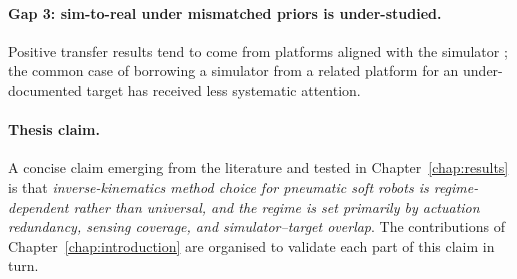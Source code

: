 \paragraph{Gap 3: sim-to-real under mismatched priors is under-studied.}
Positive transfer results tend to come from platforms aligned with the simulator \cite{fang2022jacobian, gao2024residual, park2025dualae}; the common case of borrowing a simulator from a related platform for an under-documented target has received less systematic attention.

\paragraph{Thesis claim.}
A concise claim emerging from the literature and tested in Chapter~\ref{chap:results} is that \emph{inverse-kinematics method choice for pneumatic soft robots is regime-dependent rather than universal, and the regime is set primarily by actuation redundancy, sensing coverage, and simulator--target overlap}. The contributions of Chapter~\ref{chap:introduction} are organised to validate each part of this claim in turn.
